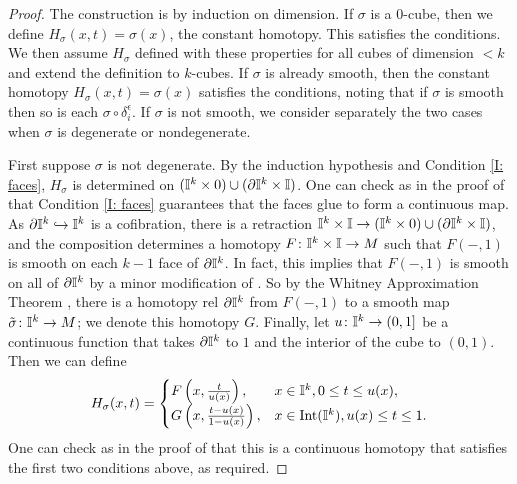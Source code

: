 \begin{proof}
	The construction is by induction on dimension.
	If $\sigma$ is a $0$-cube, then we define $H_\sigma(x,t) = \sigma(x)$, the constant homotopy.
	This satisfies the conditions.
	We then assume $H_\sigma$ defined with these properties for all cubes of dimension $<k$ and extend the definition to $k$-cubes.
	If $\sigma$ is already smooth, then the constant homotopy $H_\sigma(x,t) = \sigma(x)$ satisfies the conditions, noting that if $\sigma$ is smooth then so is each $\sigma \circ \delta_i^\epsilon$.
	If $\sigma$ is not smooth, we consider separately the two cases when $\sigma$ is degenerate or nondegenerate.

	First suppose $\sigma$ is not degenerate.
	By the induction hypothesis and Condition \eqref{I: faces}, $H_\sigma$ is determined on $(\mathbb{I}^k \times 0) \cup (\partial \mathbb{I}^k \times \mathbb{I})$.
	One can check as in the proof of \cite[Lemma 18.8]{Lee13} that Condition \eqref{I: faces} guarantees that the faces glue to form a continuous map.
	As $\partial \mathbb{I}^k \hookrightarrow \mathbb{I}^k$ is a cofibration, there is a retraction $\mathbb{I}^k \times \mathbb{I} \to (\mathbb{I}^k \times 0) \cup (\partial \mathbb{I}^k \times \mathbb{I})$, and the composition determines a homotopy $F \colon \mathbb{I}^k \times \mathbb{I} \to M$ such that $F(-,1)$ is smooth on each $k-1$ face of $\partial \mathbb{I}^k$.
	In fact, this implies that $F(-,1)$ is smooth on all of $\partial \mathbb{I}^k$ by a minor modification of \cite[Lemma 18.9]{Lee13}.
	So by the Whitney Approximation Theorem \cite[Theorem 6.26]{Lee13}, there is a homotopy rel $\partial \mathbb{I}^k$ from $F(-,1)$ to a smooth map $\tilde \sigma \colon \mathbb{I}^k \to M$; we denote this homotopy $G$.
	Finally, let $u \colon \mathbb{I}^k \to (0,1]$ be a continuous function that takes $\partial\mathbb{I}^k$ to $1$ and the interior of the cube to $(0,1)$.
	Then we can define
	\begin{equation*}
		H_\sigma(x,t) =
		\begin{cases}
			F\left(x,\frac{t}{u(x)}\right),&x \in \mathbb{I}^k, 0 \leq t \leq u(x),\\
			G\left(x,\frac{t-u(x)}{1-u(x)}\right),&x \in \text{Int}(\mathbb{I}^k), u(x) \leq t \leq 1.\\
		\end{cases}
	\end{equation*}
	One can check as in the proof of \cite[Lemma 18.8]{Lee13} that this is a continuous homotopy that satisfies the first two conditions above, as required.


\end{proof}
